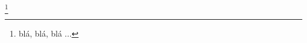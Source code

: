 \documentclass[a4paper,12pt]{book}
\begin{document}
\lipsum[1]\footnote{blá, blá, blá ...}
\end{document}
